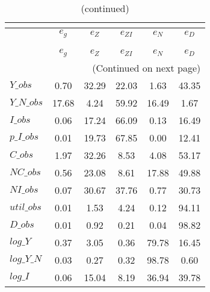  
\begin{center}
\begin{longtable}{lccccc} 
\caption{VARIANCE DECOMPOSITION (in percent)}\\
 \label{Table:th_var_decomp_uncond}\\
\toprule 
$           $	 & 	 $       {e_g}$	 & 	 $       {e_Z}$	 & 	 $    {e_{ZI}}$	 & 	 $       {e_N}$	 & 	 $       {e_D}$\\
\midrule \endfirsthead 
\caption{(continued)}\\
 \toprule \\ 
$           $	 & 	 $       {e_g}$	 & 	 $       {e_Z}$	 & 	 $    {e_{ZI}}$	 & 	 $       {e_N}$	 & 	 $       {e_D}$\\
\midrule \endhead 
\midrule \multicolumn{6}{r}{(Continued on next page)} \\ \bottomrule \endfoot 
\bottomrule \endlastfoot 
$Y\_obs     $	 & 	        0.70	 & 	       32.29	 & 	       22.03	 & 	        1.63	 & 	       43.35 \\ 
$Y\_N\_obs  $	 & 	       17.68	 & 	        4.24	 & 	       59.92	 & 	       16.49	 & 	        1.67 \\ 
$I\_obs     $	 & 	        0.06	 & 	       17.24	 & 	       66.09	 & 	        0.13	 & 	       16.49 \\ 
$p\_I\_obs  $	 & 	        0.01	 & 	       19.73	 & 	       67.85	 & 	        0.00	 & 	       12.41 \\ 
$C\_obs     $	 & 	        1.97	 & 	       32.26	 & 	        8.53	 & 	        4.08	 & 	       53.17 \\ 
$NC\_obs    $	 & 	        0.56	 & 	       23.08	 & 	        8.61	 & 	       17.88	 & 	       49.88 \\ 
$NI\_obs    $	 & 	        0.07	 & 	       30.67	 & 	       37.76	 & 	        0.77	 & 	       30.73 \\ 
$util\_obs  $	 & 	        0.01	 & 	        1.53	 & 	        4.24	 & 	        0.12	 & 	       94.11 \\ 
$D\_obs     $	 & 	        0.01	 & 	        0.92	 & 	        0.21	 & 	        0.04	 & 	       98.82 \\ 
$log\_Y     $	 & 	        0.37	 & 	        3.05	 & 	        0.36	 & 	       79.78	 & 	       16.45 \\ 
$log\_Y\_N  $	 & 	        0.03	 & 	        0.27	 & 	        0.32	 & 	       98.78	 & 	        0.60 \\ 
$log\_I     $	 & 	        0.06	 & 	       15.04	 & 	        8.19	 & 	       36.94	 & 	       39.78 \\ 

\end{longtable}
\end{center}
